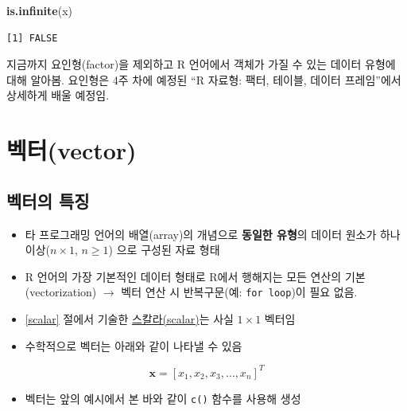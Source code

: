 \documentclass[
  11pt,
]{krantz}
\makeatletter
\newenvironment{Shaded}{\begin{snugshade}}{\end{snugshade}}
\newcommand{\KeywordTok}[1]{\textcolor[rgb]{0.27,0.27,0.27}{\textbf{#1}}}
\newcommand{\NormalTok}[1]{#1}
\providecommand{\tightlist}{%
  \setlength{\itemsep}{0pt}\setlength{\parskip}{0pt}}
\newenvironment{kframe}{%
\medskip{}
\setlength{\fboxsep}{.8em}
 \def\at@end@of@kframe{}%
 \ifinner\ifhmode%
  \def\at@end@of@kframe{\end{minipage}}%
  \begin{minipage}{\columnwidth}%
 \fi\fi%
 \def\FrameCommand##1{\hskip\@totalleftmargin \hskip-\fboxsep
 \colorbox{shadecolor}{##1}\hskip-\fboxsep
     \hskip-\linewidth \hskip-\@totalleftmargin \hskip\columnwidth}%
 \MakeFramed {\advance\hsize-\width
   \@totalleftmargin\z@ \linewidth\hsize
   \@setminipage}}%
 {\par\unskip\endMakeFramed%
 \at@end@of@kframe}
\newenvironment{rmdblock}[1]
  {
  \begin{itemize}
  \renewcommand{\labelitemi}{
    \raisebox{-.7\height}[0pt][0pt]{
      {\setkeys{Gin}{width=3em,keepaspectratio}\texttt{[image: images/\#1]}}
    }
  }
  \setlength{\fboxsep}{1em}
  \begin{kframe}
  \item
  }
  {
  \end{kframe}
  \end{itemize}
  }
\newenvironment{rmdnote}
  {\begin{rmdblock}{note}}
  {\end{rmdblock}}
\makeatother
\begin{document}
\begin{Shaded}
\begin{Highlighting}[]
\KeywordTok{is.infinite}\NormalTok{(x)}
\end{Highlighting}
\end{Shaded}

\begin{verbatim}
[1] FALSE
\end{verbatim}

\normalsize

\footnotesize

\begin{rmdnote}
\begin{rmdnote}

지금까지 요인형(factor)을 제외하고 R 언어에서 객체가 가질 수 있는 데이터 유형에 대해 알아봄. 요인형은 4주 차에 예정된 ``R 자료형: 팩터, 테이블, 데이터 프레임''에서 상세하게 배울 예정임.

\end{rmdnote}
\end{rmdnote}

\normalsize

\hypertarget{vector}{%
\section{벡터(vector)}\label{vector}}

\hypertarget{vector-prop}{%
\subsection{벡터의 특징}\label{vector-prop}}

\begin{itemize}
\tightlist
\item
  타 프로그래밍 언어의 배열(array)의 개념으로 \textbf{동일한 유형}의 데이터 원소가 하나 이상(\(n \times 1\), \(n \geq 1\)) 으로 구성된 자료 형태
\item
  R 언어의 가장 기본적인 데이터 형태로 R에서 행해지는 모든 연산의 기본(vectorization) \(\rightarrow\) 벡터 연산 시 반복구문(예: \texttt{for\ loop})이 필요 없음.
\item
  \ref{scalar} 절에서 기술한 \protect\hyperlink{scalar}{스칼라(scalar)}는 사실 \(1 \times 1\) 벡터임
\item
  수학적으로 벡터는 아래와 같이 나타낼 수 있음
\end{itemize}

\[\mathrm{\mathbf x} = [x_1, x_2, x_3, \ldots, x_n]^T
\]

\begin{itemize}
\tightlist
\item
  벡터는 앞의 예시에서 본 바와 같이 \texttt{c()} 함수를 사용해 생성
\end{itemize}
\end{document}
